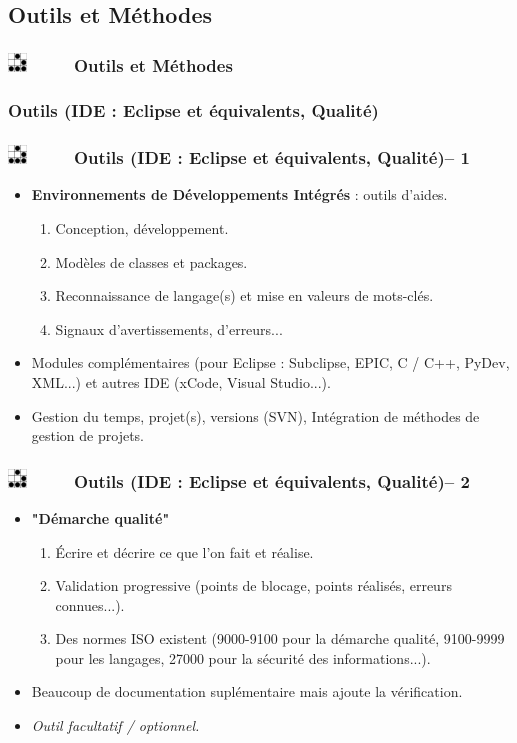 \documentclass[slidetop,11pt]{beamer}
\def\sectionPartId{Outils et M{\'e}thodes}
\def\sectionPartIdUN{Outils (IDE : Eclipse et {\'e}quivalents, Qualit{\'e})}
\def\moreInFrameTitle{\includegraphics[height=0.5cm]{img/logo_glider.png}~~~~~}
\begin{document}
\subsection{\sectionPartId}
\begin{frame}
	\frametitle{\moreInFrameTitle \sectionPartId}
	\tableofcontents[sections=2,subsectionstyle=shaded/shaded/shaded,subsubsectionstyle=shaded/shaded/shaded]
\end{frame} 

\subsubsection{\sectionPartIdUN}
\begin{frame}
	\frametitle{\moreInFrameTitle \sectionPartIdUN -- 1}
	\begin{itemize}
		\item \textbf{Environnements de D{\'e}veloppements Int{\'e}gr{\'e}s} : outils d'aides. 
		\begin{enumerate}
			\item Conception, d{\'e}veloppement. 
			\item Mod{\`e}les de classes et packages. 
			\item Reconnaissance de langage(s) et mise en valeurs de mots-cl{\'e}s. 
			\item Signaux d'avertissements, d'erreurs...
		\end{enumerate}
		\item Modules compl{\'e}mentaires (pour Eclipse : Subclipse, EPIC, C / C++, PyDev, XML...) et autres IDE (xCode, Visual Studio...). 
		\item Gestion du temps, projet(s), versions (SVN), Int{\'e}gration de m{\'e}thodes de gestion de projets.
	\end{itemize}
\end{frame}

\begin{frame}
	\frametitle{\moreInFrameTitle \sectionPartIdUN -- 2}
	\begin{itemize}		
		\item \textbf{"D{\'e}marche qualit{\'e}"}
		\begin{enumerate}
			\item {\'E}crire et d{\'e}crire ce que l'on fait et r{\'e}alise. 
			\item Validation progressive (points de blocage, points r{\'e}alis{\'e}s, erreurs connues...). 
			\item Des normes ISO existent (9000-9100 pour la d{\'e}marche qualit{\'e}, 9100-9999 pour les langages, 27000 pour la s{\'e}curit{\'e} des informations...). 
		\end{enumerate}
		\item Beaucoup de documentation supl{\'e}mentaire mais ajoute la v{\'e}rification. 
		\item \emph{Outil facultatif / optionnel. }
	\end{itemize}
\end{frame} 
\end{document}
